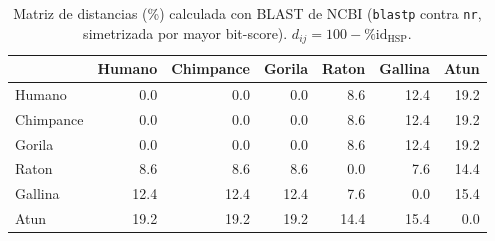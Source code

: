 \begin{table}[h]
\centering
\small
\caption{Matriz de distancias (\%) calculada con BLAST de NCBI (\texttt{blastp} contra \texttt{nr}, simetrizada por mayor bit-score). $d_{ij} = 100 - \%\text{id}_{\text{HSP}}$.}
\begin{tabular}{lrrrrrr}
\toprule
 & Humano & Chimpance & Gorila & Raton & Gallina & Atun \\
\midrule
Humano & 0.0 & 0.0 & 0.0 & 8.6 & 12.4 & 19.2 \\
Chimpance & 0.0 & 0.0 & 0.0 & 8.6 & 12.4 & 19.2 \\
Gorila & 0.0 & 0.0 & 0.0 & 8.6 & 12.4 & 19.2 \\
Raton & 8.6 & 8.6 & 8.6 & 0.0 & 7.6 & 14.4 \\
Gallina & 12.4 & 12.4 & 12.4 & 7.6 & 0.0 & 15.4 \\
Atun & 19.2 & 19.2 & 19.2 & 14.4 & 15.4 & 0.0 \\
\bottomrule
\end{tabular}
\end{table}